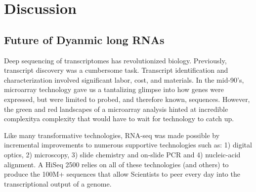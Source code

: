 \chapter{Discussion} %

\label{Chapter 5} %


\section{Future of Dyanmic long RNAs}



Deep sequencing of transcriptomes has revolutionized biology. Previously, transcript discovery was a cumbersome task. Transcript identification and characterization involved significant labor, cost, and materials. In the mid-90's, microarray technology \citep{Schena1995a} gave us a tantalizing glimpse into how genes were expressed, but were limited to probed, and therefore known, sequences. However, the green and red landscapes of a microarray analysis hinted at incredible complexity\textemdash a complexity that would have to wait for technology to catch up.

Like many transformative technologies, RNA-seq was made possible by incremental improvements to numerous supportive technologies such as: 1) digital optics, 2) microscopy, 3) slide chemistry and on-slide PCR and 4) nucleic-acid alignment. A HiSeq 2500 relies on all of these technologies (and others) to produce the 100M+ sequences that allow Scientists to peer every day into the transcriptional output of a genome.

